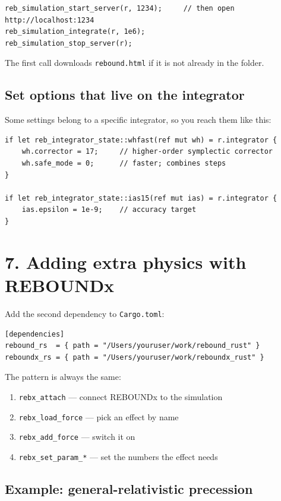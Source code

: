 \documentclass[11pt]{article}
\begin{document}
\begin{lstlisting}
reb_simulation_start_server(r, 1234);     // then open http://localhost:1234
reb_simulation_integrate(r, 1e6);
reb_simulation_stop_server(r);
\end{lstlisting}

The first call downloads \texttt{rebound.html} if it is not already in the folder.

\subsection{Set options that live on the integrator}

Some settings belong to a specific integrator, so you reach them like this:

\begin{lstlisting}
if let reb_integrator_state::whfast(ref mut wh) = r.integrator {
    wh.corrector = 17;     // higher-order symplectic corrector
    wh.safe_mode = 0;      // faster; combines steps
}

if let reb_integrator_state::ias15(ref mut ias) = r.integrator {
    ias.epsilon = 1e-9;    // accuracy target
}
\end{lstlisting}

\section{7. Adding extra physics with REBOUNDx}

Add the second dependency to \texttt{Cargo.toml}:

\begin{lstlisting}
[dependencies]
rebound_rs  = { path = "/Users/youruser/work/rebound_rust" }
reboundx_rs = { path = "/Users/youruser/work/reboundx_rust" }
\end{lstlisting}

The pattern is always the same:

\begin{enumerate}
\item \texttt{rebx\_attach} --- connect REBOUNDx to the simulation
\item \texttt{rebx\_load\_force} --- pick an effect by name
\item \texttt{rebx\_add\_force} --- switch it on
\item \texttt{rebx\_set\_param\_*} --- set the numbers the effect needs
\end{enumerate}

\subsection{Example: general-relativistic precession}
\end{document}
